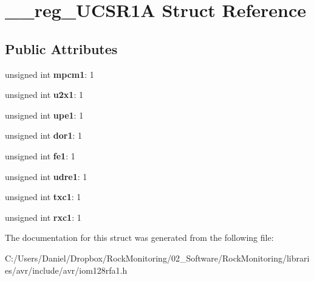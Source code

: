 \hypertarget{struct____reg___u_c_s_r1_a}{}\section{\+\_\+\+\_\+reg\+\_\+\+U\+C\+S\+R1A Struct Reference}
\label{struct____reg___u_c_s_r1_a}
\subsection*{Public Attributes}
\begin{DoxyCompactItemize}
\item 
unsigned int {\bfseries mpcm1}\+: 1\hypertarget{struct____reg___u_c_s_r1_a_aacd20c66c8d4d042bfde00e445396f3d}{}\label{struct____reg___u_c_s_r1_a_aacd20c66c8d4d042bfde00e445396f3d}

\item 
unsigned int {\bfseries u2x1}\+: 1\hypertarget{struct____reg___u_c_s_r1_a_ac48367078f867e1a8a8ad25a40d76375}{}\label{struct____reg___u_c_s_r1_a_ac48367078f867e1a8a8ad25a40d76375}

\item 
unsigned int {\bfseries upe1}\+: 1\hypertarget{struct____reg___u_c_s_r1_a_a7d129bf980c405da8ec21cff24980117}{}\label{struct____reg___u_c_s_r1_a_a7d129bf980c405da8ec21cff24980117}

\item 
unsigned int {\bfseries dor1}\+: 1\hypertarget{struct____reg___u_c_s_r1_a_a980639406495a518508c56936ae7edb3}{}\label{struct____reg___u_c_s_r1_a_a980639406495a518508c56936ae7edb3}

\item 
unsigned int {\bfseries fe1}\+: 1\hypertarget{struct____reg___u_c_s_r1_a_a98e1d666331fff05a358534d5d12fb25}{}\label{struct____reg___u_c_s_r1_a_a98e1d666331fff05a358534d5d12fb25}

\item 
unsigned int {\bfseries udre1}\+: 1\hypertarget{struct____reg___u_c_s_r1_a_a9c449ebda9b523f09e532fd9f892d077}{}\label{struct____reg___u_c_s_r1_a_a9c449ebda9b523f09e532fd9f892d077}

\item 
unsigned int {\bfseries txc1}\+: 1\hypertarget{struct____reg___u_c_s_r1_a_ab394c5bb23970e4deb70954c1668fcff}{}\label{struct____reg___u_c_s_r1_a_ab394c5bb23970e4deb70954c1668fcff}

\item 
unsigned int {\bfseries rxc1}\+: 1\hypertarget{struct____reg___u_c_s_r1_a_a4d8188b58f73d14c638f90a52ceac703}{}\label{struct____reg___u_c_s_r1_a_a4d8188b58f73d14c638f90a52ceac703}

\end{DoxyCompactItemize}


The documentation for this struct was generated from the following file\+:\begin{DoxyCompactItemize}
\item 
C\+:/\+Users/\+Daniel/\+Dropbox/\+Rock\+Monitoring/02\+\_\+\+Software/\+Rock\+Monitoring/libraries/avr/include/avr/iom128rfa1.\+h\end{DoxyCompactItemize}
